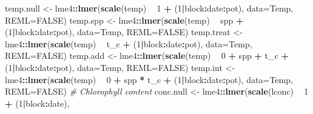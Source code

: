 \documentclass[]{scrartcl}
\newenvironment{Shaded}{\begin{snugshade}}{\end{snugshade}}
\newcommand{\CommentTok}[1]{\textcolor[rgb]{0.56,0.35,0.01}{\textit{#1}}}
\newcommand{\DataTypeTok}[1]{\textcolor[rgb]{0.13,0.29,0.53}{#1}}
\newcommand{\DecValTok}[1]{\textcolor[rgb]{0.00,0.00,0.81}{#1}}
\newcommand{\KeywordTok}[1]{\textcolor[rgb]{0.13,0.29,0.53}{\textbf{#1}}}
\newcommand{\NormalTok}[1]{#1}
\newcommand{\OperatorTok}[1]{\textcolor[rgb]{0.81,0.36,0.00}{\textbf{#1}}}
\newcommand{\OtherTok}[1]{\textcolor[rgb]{0.56,0.35,0.01}{#1}}
\newcommand{\StringTok}[1]{\textcolor[rgb]{0.31,0.60,0.02}{#1}}
\begin{document}
\begin{Shaded}
\begin{Highlighting}[]
{{{{{{{{{{{{{{{{{{{{{{{{{{{{{{{{{{{{{{{{{{{{\NormalTok{    temp.null <-}\StringTok{ }\NormalTok{lme4}\OperatorTok{::}\KeywordTok{lmer}\NormalTok{(}\KeywordTok{scale}\NormalTok{(temp) }\OperatorTok{~}\StringTok{ }\DecValTok{1} \OperatorTok{+}\StringTok{ }\NormalTok{(}\DecValTok{1}\OperatorTok{|}\NormalTok{block}\OperatorTok{:}\NormalTok{date}\OperatorTok{:}\NormalTok{pot),}
                               \DataTypeTok{data=}\NormalTok{Temp, }\DataTypeTok{REML=}\OtherTok{FALSE}\NormalTok{)}
\NormalTok{    temp.spp <-}\StringTok{ }\NormalTok{lme4}\OperatorTok{::}\KeywordTok{lmer}\NormalTok{(}\KeywordTok{scale}\NormalTok{(temp) }\OperatorTok{~}\StringTok{ }\NormalTok{spp }\OperatorTok{+}\StringTok{ }\NormalTok{(}\DecValTok{1}\OperatorTok{|}\NormalTok{block}\OperatorTok{:}\NormalTok{date}\OperatorTok{:}\NormalTok{pot), }
                              \DataTypeTok{data=}\NormalTok{Temp, }\DataTypeTok{REML=}\OtherTok{FALSE}\NormalTok{)}
\NormalTok{    temp.treat <-}\StringTok{ }\NormalTok{lme4}\OperatorTok{::}\KeywordTok{lmer}\NormalTok{(}\KeywordTok{scale}\NormalTok{(temp) }\OperatorTok{~}\StringTok{ }\NormalTok{t_c }\OperatorTok{+}\StringTok{ }\NormalTok{(}\DecValTok{1}\OperatorTok{|}\NormalTok{block}\OperatorTok{:}\NormalTok{date}\OperatorTok{:}\NormalTok{pot), }
                                \DataTypeTok{data=}\NormalTok{Temp, }\DataTypeTok{REML=}\OtherTok{FALSE}\NormalTok{)}
\NormalTok{    temp.add <-}\StringTok{ }\NormalTok{lme4}\OperatorTok{::}\KeywordTok{lmer}\NormalTok{(}\KeywordTok{scale}\NormalTok{(temp) }\OperatorTok{~}\StringTok{ }\DecValTok{0} \OperatorTok{+}\StringTok{ }\NormalTok{spp }\OperatorTok{+}\StringTok{ }\NormalTok{t_c }\OperatorTok{+}\StringTok{ }\NormalTok{(}\DecValTok{1}\OperatorTok{|}\NormalTok{block}\OperatorTok{:}\NormalTok{date}\OperatorTok{:}\NormalTok{pot), }
                              \DataTypeTok{data=}\NormalTok{Temp, }\DataTypeTok{REML=}\OtherTok{FALSE}\NormalTok{)}
\NormalTok{    temp.int <-}\StringTok{ }\NormalTok{lme4}\OperatorTok{::}\KeywordTok{lmer}\NormalTok{(}\KeywordTok{scale}\NormalTok{(temp) }\OperatorTok{~}\StringTok{ }\DecValTok{0} \OperatorTok{+}\StringTok{ }\NormalTok{spp }\OperatorTok{*}\StringTok{ }\NormalTok{t_c  }\OperatorTok{+}\StringTok{ }\NormalTok{(}\DecValTok{1}\OperatorTok{|}\NormalTok{block}\OperatorTok{:}\NormalTok{date}\OperatorTok{:}\NormalTok{pot), }
                              \DataTypeTok{data=}\NormalTok{Temp, }\DataTypeTok{REML=}\OtherTok{FALSE}\NormalTok{)}
  \CommentTok{# Chlorophyll content}
\NormalTok{    conc.null <-}\StringTok{ }\NormalTok{lme4}\OperatorTok{::}\KeywordTok{lmer}\NormalTok{(}\KeywordTok{scale}\NormalTok{(lconc) }\OperatorTok{~}\StringTok{ }\DecValTok{1} \OperatorTok{+}\StringTok{ }\NormalTok{(}\DecValTok{1}\OperatorTok{|}\NormalTok{block}\OperatorTok{:}\NormalTok{date), }
}}}}}}}}}}}}}}}}}}}}}}}}}}}}}}}}}}}}}}}}}}}}
\end{Highlighting}
\end{Shaded}
\end{document}
